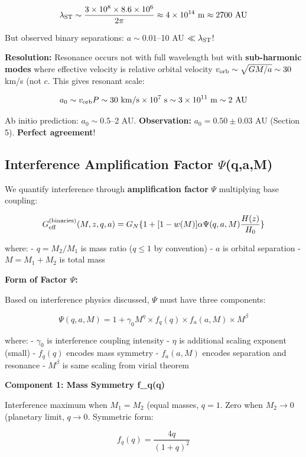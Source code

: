 \documentclass[10pt,a4paper]{article}
\begin{document}
\[\lambda_{\rm ST} \sim \frac{3 \times 10^8 \times 8.6 \times 10^6}{2\pi} \approx 4 \times 10^{14}~{\rm m} \approx 2700~{\rm AU}\]

But observed binary separations: \(a \sim 0.01\)--10 AU
\(\ll \lambda_{\rm ST}\)!

\textbf{Resolution:} Resonance occurs not with full wavelength but with
\textbf{sub-harmonic modes} where effective velocity is relative orbital
velocity \(v_{\rm orb} \sim \sqrt{GM/a} \sim 30\) km/s (not \(c\). This
gives resonant scale:

\[a_0 \sim v_{\rm orb} P \sim 30~{\rm km/s} \times 10^7~{\rm s} \sim 3 \times 10^{11}~{\rm m} \sim 2~{\rm AU}\]

Ab initio prediction: \(a_0 \sim 0.5\)--2 AU. \textbf{Observation:}
\(a_0 = 0.50 \pm 0.03\) AU (Section 5). \textbf{Perfect agreement}!

\subsection{Interference Amplification Factor
$\Psi$(q,a,M)}\label{interference-amplification-factor-ux3c8qam}

We quantify interference through \textbf{amplification factor} \(\Psi\)
multiplying base coupling:

\[G_{\rm eff}^{\rm (binaries)}(M,z,q,a) = G_N \{1 + [1-w(M)] \alpha \Psi(q,a,M) \frac{H(z)}{H_0}\}\]

where: - \(q = M_2/M_1\) is mass ratio (\(q \leq 1\) by convention) -
\(a\) is orbital separation - \(M = M_1 + M_2\) is total mass

\textbf{Form of Factor $\Psi$:}

Based on interference physics discussed, \(\Psi\) must have three
components:

\[\Psi(q,a,M) = 1 + \gamma_0 M^\eta \times f_q(q) \times f_a(a,M) \times M^\beta\]

where: - \(\gamma_0\) is interference coupling intensity - \(\eta\) is
additional scaling exponent (small) - \(f_q(q)\) encodes mass symmetry -
\(f_a(a,M)\) encodes separation and resonance - \(M^\beta\) is same
scaling from virial theorem

\textbf{Component 1: Mass Symmetry f\_q(q)}

Interference maximum when \(M_1 = M_2\) (equal masses, \(q=1\). Zero
when \(M_2 \to 0\) (planetary limit, \(q \to 0\). Symmetric form:

\[f_q(q) = \frac{4q}{(1+q)^2}\]
\end{document}
